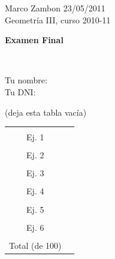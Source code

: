 \documentclass[12pt,a4paper]{report}
\theoremstyle{definition}
\begin{document}
\noindent
{\sffamily\large Marco Zambon 
\hfill     23/05/2011\\Geometr\'ia III, curso 2010-11}
 

\begin{center}\bfseries\large\textsf{Examen Final    \vspace{-2mm}}
\end{center}

 


\noindent
\hrulefill{}\\

\noindent
{\sffamily\large Tu nombre:
\\
Tu DNI: 

}


 
\begin{center}{\sffamily (deja esta tabla vac\'ia)}
\end{center}
\vspace*{-5mm}
 

\begin{table}[htdp]
\begin{center}
\begin{tabular}{|c|p{2cm} |}
\hline
&\\[-0.2cm]
Ej. 1  &\\[0.2cm]
\hline
&\\[-0.2cm]
Ej. 2  &\\[0.2cm]
\hline
&\\[-0.2cm]
Ej. 3  &\\[0.2cm]
\hline
&\\[-0.2cm]
Ej. 4  &\\[0.2cm]
\hline
&\\[-0.2cm]
Ej. 5  &\\[0.2cm]
\hline
&\\[-0.2cm]
Ej. 6  &\\[0.2cm]
\hline\hline
&\\[-0.2cm]
Total (de 100) & \\[0.2cm]
\hline
\end{tabular}
\end{center}
\label{default}
\end{table}
\vspace*{-5mm}
\end{document}
